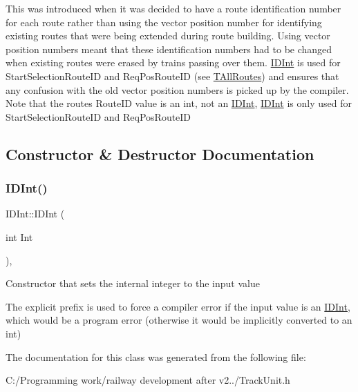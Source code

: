 This was introduced when it was decided to have a route identification number for each route rather than using the vector position number for identifying existing routes that were being extended during route building. Using vector position numbers meant that these identification numbers had to be changed when existing routes were erased by trains passing over them. \mbox{\hyperlink{class_i_d_int}{I\+D\+Int}} is used for Start\+Selection\+Route\+ID and Req\+Pos\+Route\+ID (see \mbox{\hyperlink{class_t_all_routes}{T\+All\+Routes}}) and ensures that any confusion with the old vector position numbers is picked up by the compiler. Note that the route\textquotesingle{}s Route\+ID value is an \textquotesingle{}int\textquotesingle{}, not an \textquotesingle{}\mbox{\hyperlink{class_i_d_int}{I\+D\+Int}}\textquotesingle{}, \textquotesingle{}\mbox{\hyperlink{class_i_d_int}{I\+D\+Int}}\textquotesingle{} is only used for Start\+Selection\+Route\+ID and Req\+Pos\+Route\+ID 

\subsection{Constructor \& Destructor Documentation}
\mbox{\label{class_i_d_int_ae51fdc864457738e484bb91c829b082c}} 
\subsubsection{\texorpdfstring{I\+D\+Int()}{IDInt()}}
{\footnotesize\ttfamily I\+D\+Int\+::\+I\+D\+Int (\begin{DoxyParamCaption}\item[{int}]{Int }\end{DoxyParamCaption})\hspace{0.3cm}{\ttfamily [inline]}, {\ttfamily [explicit]}}

Constructor that sets the internal integer to the input value

The \textquotesingle{}explicit\textquotesingle{} prefix is used to force a compiler error if the input value is an \mbox{\hyperlink{class_i_d_int}{I\+D\+Int}}, which would be a program error (otherwise it would be implicitly converted to an int) 

The documentation for this class was generated from the following file\+:\begin{DoxyCompactItemize}
\item 
C\+:/\+Programming work/railway development after v2../Track\+Unit.\+h\end{DoxyCompactItemize}
